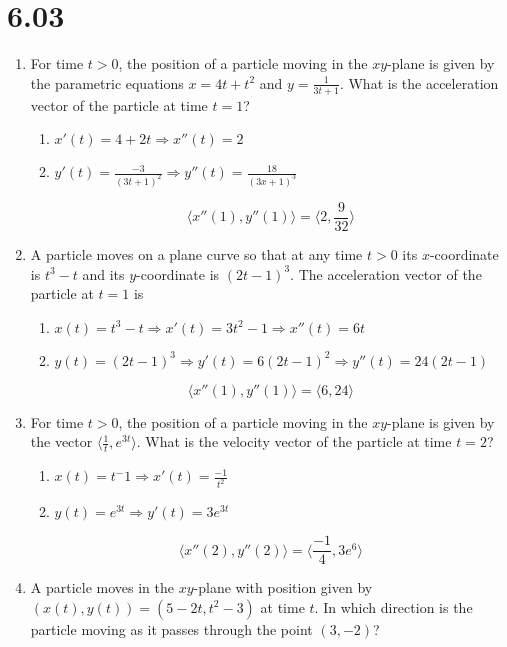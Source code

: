 \documentclass[12pt]{article}
\begin{document}
\section*{6.03}
    \begin{enumerate}
        \item For time $t>0$, the position of a particle moving in the $xy$-plane is given by the parametric equations $x=4t+t^2$ and $y=\frac{1}{3t+1}$. What is the acceleration vector of the particle at time $t=1$?
        \begin{enumerate}
            \item $x'(t) = 4 + 2t \Longrightarrow x''(t) = 2$
            \item $y'(t) = \frac{-3}{(3t+1)^2} \Longrightarrow y''(t) =\frac{18}{(3x+1)^3} $
        \end{enumerate}
        $$\langle x''(1), y''(1) \rangle  = \boxed{\bigg\langle 2, \frac{9}{32}\bigg\rangle}$$
        \item A particle moves on a plane curve so that at any time $t>0$ its $x$-coordinate is $t^3-t$ and its $y$-coordinate is $(2t-1)^3$. The acceleration vector of the particle at $t=1$ is
        \begin{enumerate}
            \item $x(t)=t^3-t \Longrightarrow x'(t) = 3t^2-1 \Longrightarrow x''(t)=6t$
            \item $y(t) = (2t-1)^3 \Longrightarrow y'(t) = 6(2t-1)^2 \Longrightarrow y''(t) = 24(2t-1)$
        \end{enumerate}
        $$\langle x''(1), y''(1) \rangle  = \boxed{\bigg\langle 6, 24\bigg\rangle}$$
        \item For time $t > 0$, the position of a particle moving in the $xy$-plane is given by the vector $\langle \frac{1}{t},e^{3t} \rangle$. What is the velocity vector of the particle at time $t = 2$?
        \begin{enumerate}
            \item $x(t) = t^-1 \Longrightarrow x'(t) = \frac{-1}{t^2}$
            \item $y(t) = e^{3t} \Longrightarrow y'(t) = 3e^{3t}$
        \end{enumerate}
        $$\langle x''(2), y''(2) \rangle  = \boxed{\bigg\langle \frac{-1}{4}, 3e^6 \bigg\rangle}$$
        \item A particle moves in the $xy$-plane with position given by $(x (t), y(t )) = (5 - 2t,t^2 - 3)$ at time $t$. In which direction is the particle moving as it passes through the point $(3, -2)$?

\end{enumerate}
\end{document}

